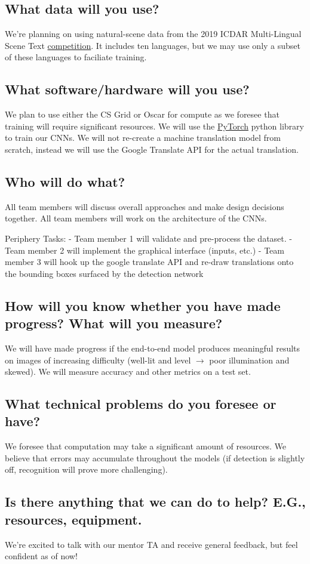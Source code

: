 \subsection*{What data will you use?}
We're planning on using natural-scene data from the 2019 ICDAR	Multi-Lingual Scene Text \href{https://arxiv.org/pdf/1907.00945.pdf}{competition}. 
It includes ten languages, but we may use only a subset of these languages to faciliate training.

\subsection*{What software/hardware will you use?}
We plan to use either the CS Grid or Oscar for compute as we foresee that training will require significant resources.
We will use the \href{https://pytorch.org/}{PyTorch} python library to train our CNNs.
We will not re-create a machine translation model from scratch, instead we will use the Google Translate API for the actual translation.

\subsection*{Who will do what?}

All team members will discuss overall approaches and make design decisions together. 
All team members will work on the architecture of the CNNs.

Periphery Tasks:
- Team member 1 will validate and pre-process the dataset. 
- Team member 2 will implement the graphical interface (inputs, etc.)
- Team member 3 will hook up the google translate API and re-draw translations onto the bounding boxes surfaced by the detection network

\subsection*{How will you know whether you have made progress? What will you measure?}
We will have made progress if the end-to-end model produces meaningful results on images of increasing difficulty (well-lit and level $\rightarrow$ poor illumination and skewed).
We will measure accuracy and other metrics on a test set. 

\subsection*{What technical problems do you foresee or have?}
We foresee that computation may take a significant amount of resources. 
We believe that errors may accumulate throughout the models (if detection is slightly off, recognition will prove more challenging).

\subsection*{Is there anything that we can do to help? E.G., resources, equipment.}
We're excited to talk with our mentor TA and receive general feedback, but feel confident as of now!


